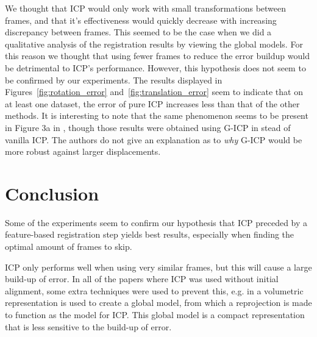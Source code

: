 \documentclass[a4paper]{article}
\begin{document}
We thought that \ac{ICP} would only work with small transformations between frames, and that it's effectiveness would quickly decrease with increasing discrepancy between frames. This seemed to be the case when we did a qualitative analysis of the registration results by viewing the global models. For this reason we thought that using fewer frames to reduce the error buildup would be detrimental to \ac{ICP}'s performance. However, this hypothesis does not seem to be confirmed by our experiments. The results displayed in Figures~\ref{fig:rotation_error} and~\ref{fig:translation_error} seem to indicate that on at least one dataset, the error of pure \ac{ICP} increases less than that of the other methods. It is interesting to note that the same phenomenon seems to be present in Figure 3a in \cite{steinbruecker_sturm_cremers_iccv11}, though those results were obtained using G-ICP in stead of vanilla \ac{ICP}. The authors do not give an explanation as to \emph{why} G-ICP would be more robust against larger displacements.


\section{Conclusion}
Some of the experiments seem to confirm our hypothesis that \ac{ICP} preceded by a feature-based registration step yields best results, especially when finding the optimal amount of frames to skip.

\ac{ICP} only performs well when using very similar frames, but this will cause a large build-up of error. In all of the papers where \ac{ICP} was used without initial alignment, some extra techniques were used to prevent this, e.g. in \cite{izadi2011kinectfusion} a volumetric representation is used to create a global model, from which a reprojection is made to function as the model for \ac{ICP}. This global model is a compact representation that is less sensitive to the build-up of error.






{}

\end{document}
